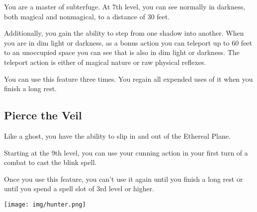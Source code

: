 \begin{multicols*}{2}
You are a master of subterfuge. At 7th level, you can see normally in darkness, both magical and nonmagical, to a distance of 30 feet.

Additionally, you gain the ability to step from one shadow into another. When you are in dim light or darkness, as a bonus action you can teleport up to 60 feet to an unoccupied space you can see that is also in dim light or darkness. The teleport action is either of magical nature or raw physical reflexes. 

You can use this feature three times. You regain all expended uses of it when you finish a long rest.

\subsection*{Pierce the Veil}

Like a ghost, you have the ability to slip in and out of the Ethereal Plane.

Starting at the 9th level, you can use your cunning action in your first turn of a combat to cast the blink spell.

Once you use this feature, you can’t use it again until you finish a long rest or until you spend a spell slot of 3rd level or higher.

\begin{Figure}
\centering
\texttt{[image: img/hunter.png]}
\end{Figure}
    
\end{multicols*}


\clearpage

